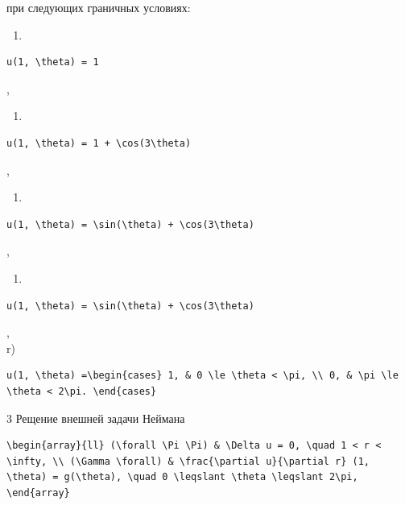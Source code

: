 \documentclass[
  ukrainian,
]{article}
\providecommand{\tightlist}{%
  \setlength{\itemsep}{0pt}\setlength{\parskip}{0pt}}
\begin{document}
при следующих граничных условиях:

\begin{enumerate}
\def\labelenumi{\alph{enumi})}
\tightlist
\item
\end{enumerate}

\begin{verbatim}
u(1, \theta) = 1
\end{verbatim}

,

\begin{enumerate}
\def\labelenumi{\arabic{enumi})}
\setcounter{enumi}{5}
\tightlist
\item
\end{enumerate}

\begin{verbatim}
u(1, \theta) = 1 + \cos(3\theta)
\end{verbatim}

,

\begin{enumerate}
\def\labelenumi{\Alph{enumi})}
\setcounter{enumi}{1}
\tightlist
\item
\end{enumerate}

\begin{verbatim}
u(1, \theta) = \sin(\theta) + \cos(3\theta)
\end{verbatim}

,

\begin{enumerate}
\def\labelenumi{\Alph{enumi})}
\setcounter{enumi}{1}
\tightlist
\item
\end{enumerate}

\begin{verbatim}
u(1, \theta) = \sin(\theta) + \cos(3\theta)
\end{verbatim}

,\\
r)

\begin{verbatim}
u(1, \theta) =\begin{cases} 1, & 0 \le \theta < \pi, \\ 0, & \pi \le \theta < 2\pi. \end{cases}
\end{verbatim}

3 Рещение внешней задачи Неймана

\begin{verbatim}
\begin{array}{ll} (\forall \Pi \Pi) & \Delta u = 0, \quad 1 < r < \infty, \\ (\Gamma \forall) & \frac{\partial u}{\partial r} (1, \theta) = g(\theta), \quad 0 \leqslant \theta \leqslant 2\pi, \end{array}
\end{verbatim}
\end{document}
